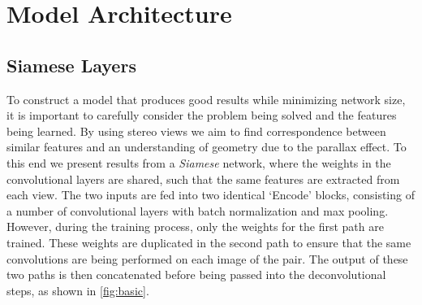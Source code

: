 \documentclass[ %
                    author={Gavin Parker},
                supervisor={Dr. Neill Campbell},
                    degree={MEng},
                     title={Deep Learning for Illumination Estimation from Stereo Images},
                  subtitle={},
                      type={Research},
                      year={2018} ]{dissertation}
\begin{document}
\section{Model Architecture}
\subsection{Siamese Layers}
To construct a model that produces good results while minimizing network size, it is important to carefully consider the problem being solved and the features being learned. By using stereo views we aim to find correspondence between similar features and an understanding of geometry due to the parallax effect. To this end we present results from a \textit{Siamese} network, where the weights in the convolutional layers are shared, such that the same features are extracted from each view. The two inputs are fed into two identical `Encode' blocks, consisting of a number of convolutional layers with batch normalization and max pooling. However, during the training process, only the weights for the first path are trained. These weights are duplicated in the second path to ensure that the same convolutions are being performed on each image of the pair. The output of these two paths is then concatenated before being passed into the deconvolutional steps, as shown in \ref{fig:basic}.
\newline
\end{document}
